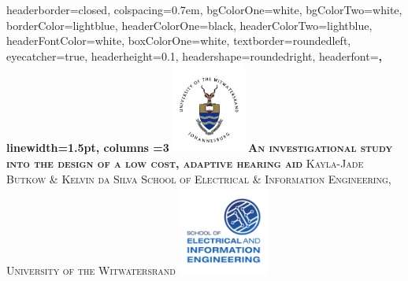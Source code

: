\documentclass[landscape,a1paper,fontscale=0.5]{baposter} %
\begin{document}
\begin{poster}
{
headerborder=closed, %
colspacing=0.7em, %
bgColorOne=white, %
bgColorTwo=white, %
borderColor=lightblue, %
headerColorOne=black, %
headerColorTwo=lightblue, %
headerFontColor=white, %
boxColorOne=white, %
textborder=roundedleft, %
eyecatcher=true, %
headerheight=0.1\textheight, %
headershape=roundedright, %
headerfont=\Large\bf\textsc, %
linewidth=1.5pt, %
columns =3
}
%
{\includegraphics[height=8em]{wits.jpg}} %
{\bf\textsc{An investigational study into the design of a low cost, adaptive hearing aid}\vspace{0.3em}} %
{\textsc{ Kayla-Jade Butkow \& Kelvin da Silva \hspace{12pt} {\small School of Electrical \& Information Engineering, University of the Witwatersrand}}} %
{\includegraphics[height=8em]{EIE.pdf}} %


\end{poster}
\end{document}
